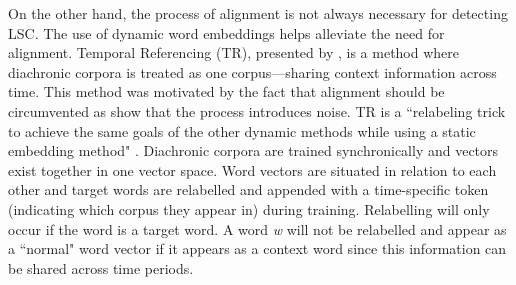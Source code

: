 On the other hand, the process of alignment is not always necessary for detecting LSC. The use of dynamic word embeddings helps alleviate the need for alignment. Temporal Referencing (TR), presented by \citet{dubossarsky-etal-2019-time}, is a method where diachronic corpora is treated as one corpus—sharing context information across time. This method was motivated by the fact that alignment should be circumvented as \citet{dubossarsky-etal-2017-outta} show that the process introduces noise. TR is a ``relabeling trick to achieve the same goals of the other dynamic methods while using a static embedding method" \citep{tahmasebi-survey2018}. Diachronic corpora are trained synchronically and vectors exist together in one vector space. Word vectors are situated in relation to each other and target words are relabelled and appended with a time-specific token (indicating which corpus they appear in) during training. Relabelling will only occur if the word is a target word. A word \emph{w} will not be relabelled and appear as a ``normal" word vector if it appears as a context word since this information can be shared across time periods. 